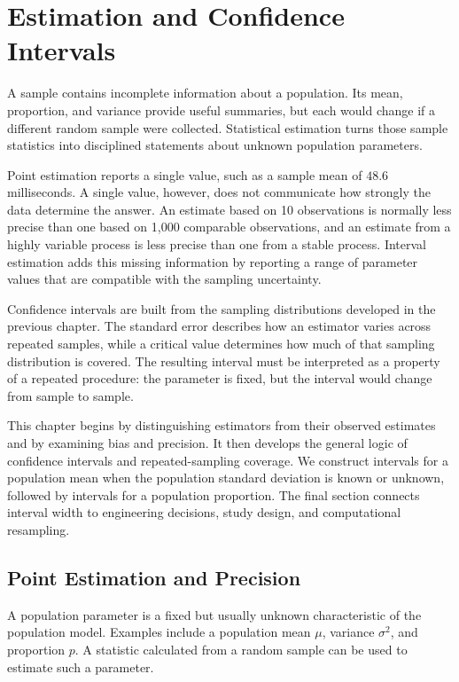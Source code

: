 \chapter{Estimation and Confidence Intervals}
\label{ch:confidence-intervals}

A sample contains incomplete information about a population. Its mean, proportion, and variance provide useful summaries, but each would change if a different random sample were collected. Statistical estimation turns those sample statistics into disciplined statements about unknown population parameters.

Point estimation reports a single value, such as a sample mean of $48.6$ milliseconds. A single value, however, does not communicate how strongly the data determine the answer. An estimate based on 10 observations is normally less precise than one based on 1,000 comparable observations, and an estimate from a highly variable process is less precise than one from a stable process. Interval estimation adds this missing information by reporting a range of parameter values that are compatible with the sampling uncertainty.

Confidence intervals are built from the sampling distributions developed in the previous chapter. The standard error describes how an estimator varies across repeated samples, while a critical value determines how much of that sampling distribution is covered. The resulting interval must be interpreted as a property of a repeated procedure: the parameter is fixed, but the interval would change from sample to sample.

This chapter begins by distinguishing estimators from their observed estimates and by examining bias and precision. It then develops the general logic of confidence intervals and repeated-sampling coverage. We construct intervals for a population mean when the population standard deviation is known or unknown, followed by intervals for a population proportion. The final section connects interval width to engineering decisions, study design, and computational resampling.

\section{Point Estimation and Precision}
\label{sec:point-estimation}

A population parameter is a fixed but usually unknown characteristic of the population model. Examples include a population mean $\mu$, variance $\sigma^2$, and proportion $p$. A statistic calculated from a random sample can be used to estimate such a parameter.

